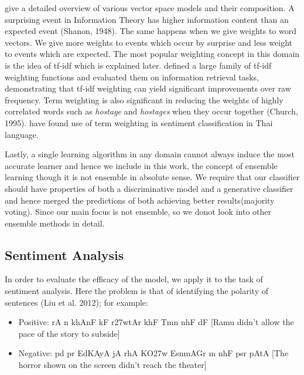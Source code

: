 \cite{Turney:10} give a detailed overview of various vector space models and their composition. A surprising event in Information Theory has higher information content than an expected event (Shanon, 1948). The same happens when we give weights to word vectors. We give more weights to events which occur by surprise and less weight to events which are expected. The most popular weighting concept in this domain is the idea of tf-idf which is explained later. \cite{Salton:88} defined a large family of tf-idf weighting functions and evaluated them on information retrieval tasks, demonstrating that tf-idf weighting can yield significant improvements over raw frequency. Term weighting is also significant in reducing the weights of highly correlated words such as \emph{hostage} and \emph{hostages} when they occur together (Church, 1995). \cite{Chirawichitchai:14} have found use of term weighting in sentiment classification in Thai language.

Lastly, a single learning algorithm in any domain cannot always induce the most accurate learner and hence we include in this work, the concept of ensemble learning though it is not ensemble in absolute sense. We require that our classifier should have properties of both a discriminative model and a generative classifier and hence merged the predictions of both achieving better results(majority voting). Since our main focus is not ensemble, so we donot look into other ensemble methods in detail.

\subsection{Sentiment Analysis}
In order to evaluate the efficacy of the model, we apply it to the task of sentiment analysis. Here the problem is that of identifying the polarity of sentences (Liu et al. 2012); for example: 
\begin{itemize}
\item Positive: {\dn rA n\? khAnF kF r\327wtAr khF{\qva} Tmn\? nhF{\qva} dF} [Ramu didn't allow the pace of the story to subside]
\item Negative: {\dn pd\?{\qvb} pr EdKAyA jA rhA KO\327w Esn\?mAGr m\?
nhF{\qva} psr pAtA} [The horror shown on the screen didn't reach the theater]
\end{itemize}

